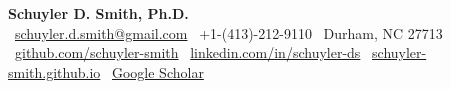 
\newcommand{\Address}{Durham, NC 27713}
\newcommand{\Phone}{+1-(413)-212-9110}
\newcommand{\EMail}{schuyler.d.smith@gmail.com}
\newcommand{\GitHub}{https://github.com/schuyler-smith}
\newcommand{\LinkedIn}{https://linkedin.com/in/schuyler-ds}
\newcommand{\WebPage}{https://schuyler-smith.github.io/}
\newcommand{\ScholarPage}{https://scholar.google.com/citations?user=fTKo_RgAAAAJ\&hl=en\&oi=sra}

\noindent
\textbf{\LARGE Schuyler D. Smith, Ph.D.} \\[0.2cm]

\faEnvelope\ \href{mailto:\EMail}{\EMail} \quad
\faPhone\ \Phone \quad
\faMapMarker\ \Address \\[0.1cm]

\faGithub\ \href{\GitHub}{github.com/schuyler-smith} \quad
\faLinkedin\ \href{\LinkedIn}{linkedin.com/in/schuyler-ds} \quad
\faGlobe\ \href{\WebPage}{schuyler-smith.github.io} \quad
\aiGoogleScholar\ \href{\ScholarPage}{Google Scholar}


